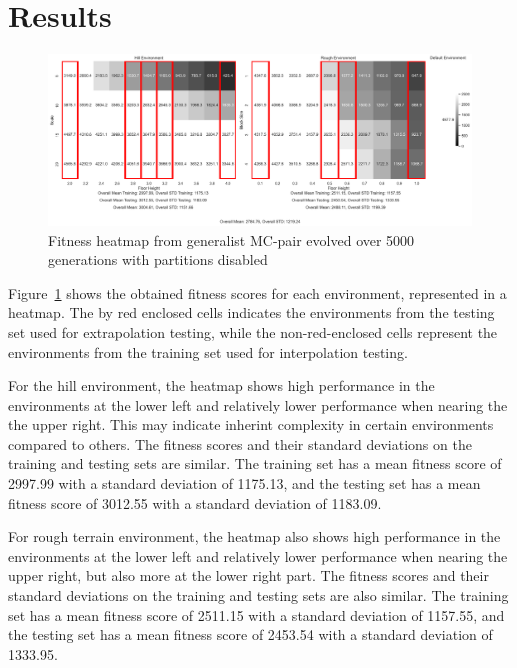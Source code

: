 \section{Results}
    \begin{figure}[ht]
        \centering
        \includegraphics[width=\linewidth]{./resources/generalist_4_2784/fitness_heatmap.png}
        \caption{Fitness heatmap from generalist MC-pair evolved over 5000 generations with partitions disabled}
        \label{fig:fit_heat_5000}
    \end{figure}

    Figure~\ref{fig:fit_heat_5000} shows the obtained fitness scores for each environment, represented in a heatmap.  The by red enclosed cells indicates the environments from the testing set used for extrapolation testing, while the non-red-enclosed cells represent the environments from the training set used for interpolation testing. 
    
    For the hill environment, the heatmap shows high performance in the environments at the lower left and relatively lower performance when nearing the the upper right. This may indicate inherint complexity in certain environments compared to others. The fitness scores and their standard deviations on the training and testing sets are similar. The training set has a mean fitness score of 2997.99 with a standard deviation of 1175.13, and the testing set has a mean fitness score of 3012.55 with a standard deviation of 1183.09. 
    
    For rough terrain environment, the heatmap also shows high performance in the environments at the lower left and relatively lower performance when nearing the upper right, but also more at the lower right part. The fitness scores and their standard deviations on the training and testing sets are also similar. The training set has a mean fitness score of 2511.15 with a standard deviation of 1157.55, and the testing set has a mean fitness score of 2453.54 with a standard deviation of 1333.95.


